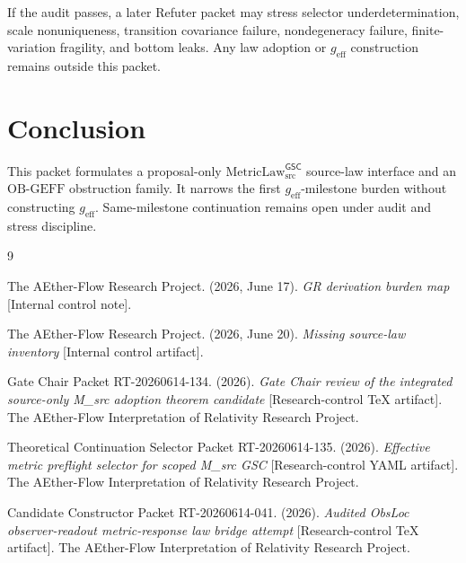\documentclass[11pt]{article}
\newcommand{\MetricLaw}{\mathrm{MetricLaw}_{\mathrm{src}}^{\mathsf{GSC}}}
\newcommand{\geff}{g_{\mathrm{eff}}}
\begin{document}
If the audit passes, a later Refuter packet may stress selector
underdetermination, scale nonuniqueness, transition covariance failure,
nondegeneracy failure, finite-variation fragility, and bottom leaks. Any law
adoption or \(\geff\) construction remains outside this packet.

\section{Conclusion}

This packet formulates a proposal-only \(\MetricLaw\) source-law interface and
an \(\mathrm{OB\mbox{-}GEFF}\) obstruction family. It narrows the first
\(\geff\)-milestone burden without constructing \(\geff\). Same-milestone
continuation remains open under audit and stress discipline.

\begin{thebibliography}{9}

The AEther-Flow Research Project. (2026, June 17). \emph{GR derivation burden
map} [Internal control note].

The AEther-Flow Research Project. (2026, June 20). \emph{Missing source-law
inventory} [Internal control artifact].

Gate Chair Packet RT-20260614-134. (2026). \emph{Gate Chair review of the
integrated source-only M\_src adoption theorem candidate} [Research-control
TeX artifact]. The AEther-Flow Interpretation of Relativity Research Project.

Theoretical Continuation Selector Packet RT-20260614-135. (2026).
\emph{Effective metric preflight selector for scoped M\_src GSC}
[Research-control YAML artifact]. The AEther-Flow Interpretation of
Relativity Research Project.

Candidate Constructor Packet RT-20260614-041. (2026). \emph{Audited ObsLoc
observer-readout metric-response law bridge attempt} [Research-control TeX
artifact]. The AEther-Flow Interpretation of Relativity Research Project.

\end{thebibliography}
\end{document}
